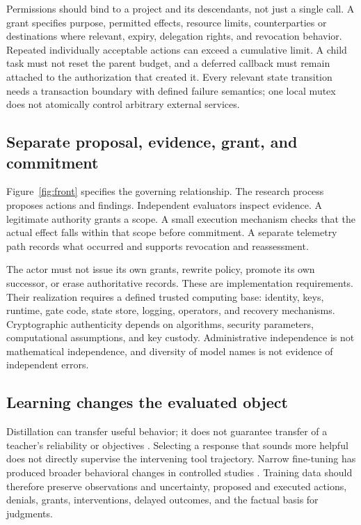\documentclass[10pt,twocolumn,letterpaper]{article}
\begin{document}
Permissions should bind to a project and its descendants, not just a single call. A grant specifies purpose, permitted effects, resource limits, counterparties or destinations where relevant, expiry, delegation rights, and revocation behavior. Repeated individually acceptable actions can exceed a cumulative limit. A child task must not reset the parent budget, and a deferred callback must remain attached to the authorization that created it. Every relevant state transition needs a transaction boundary with defined failure semantics; one local mutex does not atomically control arbitrary external services.

\subsection{Separate proposal, evidence, grant, and commitment}
Figure~\ref{fig:front} specifies the governing relationship. The research process proposes actions and findings. Independent evaluators inspect evidence. A legitimate authority grants a scope. A small execution mechanism checks that the actual effect falls within that scope before commitment. A separate telemetry path records what occurred and supports revocation and reassessment.

The actor must not issue its own grants, rewrite policy, promote its own successor, or erase authoritative records. These are implementation requirements. Their realization requires a defined trusted computing base: identity, keys, runtime, gate code, state store, logging, operators, and recovery mechanisms. Cryptographic authenticity depends on algorithms, security parameters, computational assumptions, and key custody. Administrative independence is not mathematical independence, and diversity of model names is not evidence of independent errors.

\subsection{Learning changes the evaluated object}
Distillation can transfer useful behavior; it does not guarantee transfer of a teacher's reliability or objectives \cite{distill}. Selecting a response that sounds more helpful does not directly supervise the intervening tool trajectory. Narrow fine-tuning has produced broader behavioral changes in controlled studies \cite{emergent}. Training data should therefore preserve observations and uncertainty, proposed and executed actions, denials, grants, interventions, delayed outcomes, and the factual basis for judgments.
\end{document}

